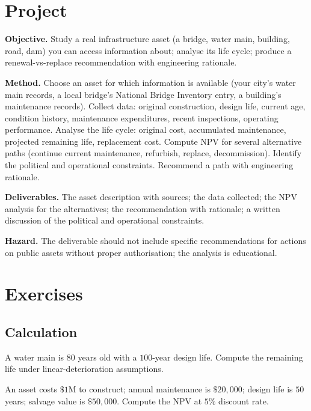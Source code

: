 \section{Project}

\begin{project}
\textbf{Objective.} Study a real infrastructure asset (a bridge, water main, building, road, dam) you can access information about; analyse its life cycle; produce a renewal-vs-replace recommendation with engineering rationale.

\textbf{Method.} Choose an asset for which information is available (your city's water main records, a local bridge's National Bridge Inventory entry, a building's maintenance records). Collect data: original construction, design life, current age, condition history, maintenance expenditures, recent inspections, operating performance. Analyse the life cycle: original cost, accumulated maintenance, projected remaining life, replacement cost. Compute NPV for several alternative paths (continue current maintenance, refurbish, replace, decommission). Identify the political and operational constraints. Recommend a path with engineering rationale.

\textbf{Deliverables.} The asset description with sources; the data collected; the NPV analysis for the alternatives; the recommendation with rationale; a written discussion of the political and operational constraints.

\textbf{Hazard.} The deliverable should not include specific recommendations for actions on public assets without proper authorisation; the analysis is educational.
\end{project}

\section{Exercises}

\subsection*{Calculation}

\begin{exercise}
A water main is $80$ years old with a $100$-year design life. Compute the remaining life under linear-deterioration assumptions.
\end{exercise}

\begin{exercise}
An asset costs $\$1\text{M}$ to construct; annual maintenance is $\$20{,}000$; design life is $50$ years; salvage value is $\$50{,}000$. Compute the NPV at $5\%$ discount rate.
\end{exercise}

